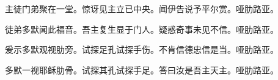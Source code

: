 \documentclass[UTF8,17pt]{ctexart}
\begin{document}
主徒门弟聚在⼀堂。惊讶见主⽴已中央。闻伊告说予平尔赏。哑肋路亚。

徒弟多默闻此福⾳。吾主复⽣显于门⼈。疑惑奇事未见不信。哑肋路亚。

爰⽰多默观视肋旁。试探⾜孔试探⼿伤。不肯信德忠信是当。哑肋路亚。

多默⼀视耶稣肋⾻。试探其孔试探⼿⾜。答曰汝是吾主天主。哑肋路亚。




\end{document}
